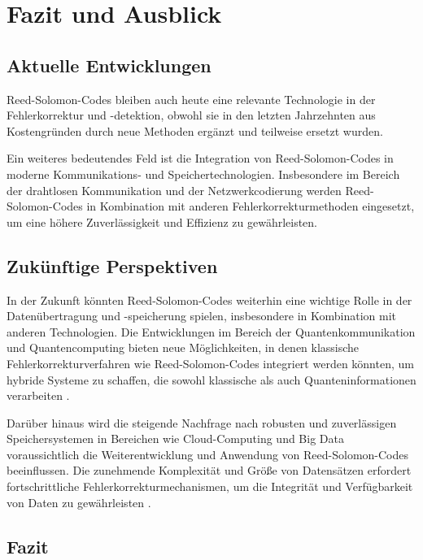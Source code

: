 \chapter{Fazit und Ausblick}\label{ch:summary}

\section{Aktuelle Entwicklungen}

Reed-Solomon-Codes bleiben auch heute eine relevante Technologie in der Fehlerkorrektur und -detektion, obwohl sie in den letzten Jahrzehnten aus Kostengründen durch neue Methoden ergänzt und teilweise ersetzt wurden. 

Ein weiteres bedeutendes Feld ist die Integration von Reed-Solomon-Codes in moderne Kommunikations- und Speichertechnologien. 
Insbesondere im Bereich der drahtlosen Kommunikation und der Netzwerkcodierung werden Reed-Solomon-Codes in Kombination mit anderen Fehlerkorrekturmethoden eingesetzt, um eine höhere Zuverlässigkeit und Effizienz zu gewährleisten.

\section{Zukünftige Perspektiven}

In der Zukunft könnten Reed-Solomon-Codes weiterhin eine wichtige Rolle in der Datenübertragung und -speicherung spielen, insbesondere in Kombination mit anderen Technologien. 
Die Entwicklungen im Bereich der Quantenkommunikation und Quantencomputing bieten neue Möglichkeiten, in denen klassische Fehlerkorrekturverfahren wie Reed-Solomon-Codes integriert werden könnten, um hybride Systeme zu schaffen, die sowohl klassische als auch Quanteninformationen verarbeiten \cite{grasslQuantumReedSolomonCodes1999}.

Darüber hinaus wird die steigende Nachfrage nach robusten und zuverlässigen Speichersystemen in Bereichen wie Cloud-Computing und Big Data voraussichtlich die Weiterentwicklung und Anwendung von Reed-Solomon-Codes beeinflussen. 
Die zunehmende Komplexität und Größe von Datensätzen erfordert fortschrittliche Fehlerkorrekturmechanismen, um die Integrität und Verfügbarkeit von Daten zu gewährleisten \cite{sathiamoorthyXORingElephantsNovel2013}.

\section{Fazit}

